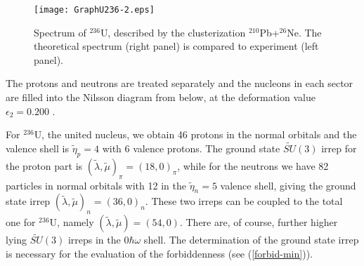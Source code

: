 \documentclass[12pt]{article}
\begin{document}
\begin{figure}
\centerline{
\texttt{[image: GraphU236-2.eps]} 
}
\caption{\label{Uran} 
Spectrum of $^{236}$U, described by the clusterization $^{210}$Pb+$^{26}$Ne. The theoretical spectrum
(right panel) is compared to experiment (left panel).
}
\end{figure}

The protons and neutrons are treated separately and the nucleons in each sector
are filled into the Nilsson
diagram from below, at the deformation value $\epsilon_2 =0.200$ \cite{nix-tables}.

For $^{236}$U, the united nucleus, we obtain 46 protons 
in the normal orbitals and the valence shell is
$\widetilde{\eta}_p=4$ with 6 valence protons. The ground state 
$\widetilde{SU}(3)$ irrep for the proton part
is $(\tilde{\lambda} , \tilde{\mu})_{\pi} =(18,0)_\pi$, while for the neutrons we have  82 particles 
in normal orbitals with
12 in the $\widetilde{\eta}_n=5$ valence shell, giving the ground state irrep
$(\tilde{\lambda} , \tilde{\mu})_{n} =(36,0)_n$.
These two irreps can be coupled to the total one for $^{236}$U, namely 
$(\tilde{\lambda} , \tilde{\mu}) =(54,0)$.
There are, of course, further higher lying $\widetilde{SU}(3)$ irreps in the $0\hbar\omega$ shell.
The determination of the ground state irrep is necessary for the evaluation of 
the forbiddenness (see (\ref{forbid-min})).
\end{document}
